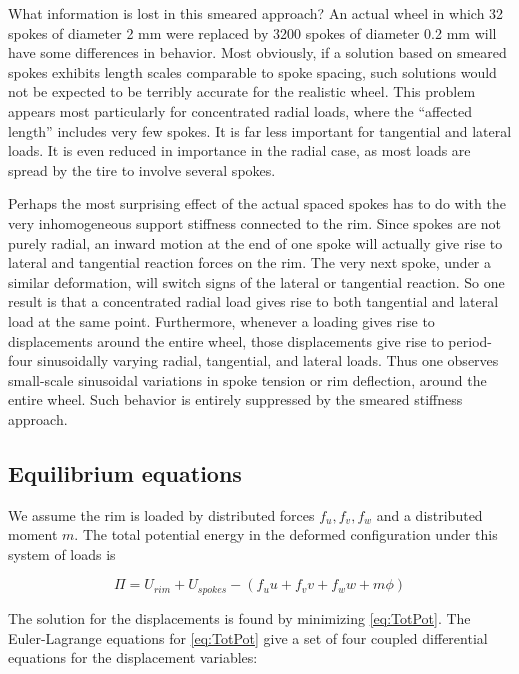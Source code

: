 \documentclass[../thesis.tex]{subfiles}
\begin{document}
What information is lost in this smeared approach? An actual wheel in which 32 spokes of diameter 2 mm were replaced by 3200 spokes of diameter 0.2 mm will have some differences in behavior.
Most obviously, if a solution based on smeared spokes exhibits length scales comparable to spoke spacing, such solutions would not be expected to be terribly accurate for the realistic wheel. This problem appears most particularly for concentrated radial loads, where the ``affected length'' includes very few spokes. It is far less important for tangential and lateral loads. It is even reduced in importance in the radial case, as most loads are spread by the tire to involve several spokes.

Perhaps the most surprising effect of the actual spaced spokes has to do with the very inhomogeneous support stiffness connected to the rim. Since spokes are not purely radial, an inward motion at the end of one spoke will actually give rise to lateral and tangential reaction forces on the rim. The very next spoke, under a similar deformation, will switch signs of the lateral or tangential reaction. So one result is that a concentrated radial load gives rise to both tangential and lateral load at the same point. Furthermore, whenever a loading gives rise to displacements around the entire wheel, those displacements give rise to period-four sinusoidally varying radial, tangential, and lateral loads. Thus one observes small-scale sinusoidal variations in spoke tension or rim deflection, around the entire wheel. Such behavior is entirely suppressed by the smeared stiffness approach.


\subsection{Equilibrium equations}

We assume the rim is loaded by distributed forces $f_u,f_v,f_w$ and a distributed moment $m$. The total potential energy in the deformed configuration under this system of loads is

\begin{equation}
\label{eq:TotPot}
\Pi = U_{rim} + U_{spokes} - (f_uu+f_vv+f_ww+m\phi)
\end{equation}

The solution for the displacements is found by minimizing \eqref{eq:TotPot}. The Euler-Lagrange equations for \eqref{eq:TotPot} give a set of four coupled differential equations for the displacement variables:
\end{document}
